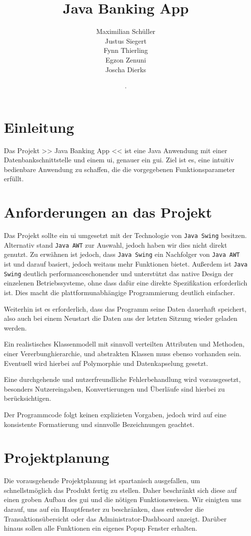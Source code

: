\documentclass[
	12pt,
	a4paper,
	hidelinks
	]{report}
\title{Java Banking App}
\author{Maximilian Schüller \\ Justus Siegert \\ Fynn Thierling \\ Egzon Zenuni \\ Joscha Dierks }
\date{\the\day. \monthword{\month} \the\year}
\newcommand{\code}[1]{\texttt{#1}}
\begin{document}
\maketitle
\tableofcontents
\newpage

\section{Einleitung}
Das Projekt >> Java Banking App << ist eine Java Anwendung mit einer Datenbankschnittstelle und einem \ac{ui}, genauer ein \ac{gui}. Ziel ist es, eine intuitiv bedienbare Anwendung zu schaffen, die die vorgegebenen Funktionsparameter erfüllt.

\section{Anforderungen an das Projekt}
Das Projekt sollte ein \ac{ui} umgesetzt mit der Technologie von \code{Java Swing} besitzen. Alternativ stand \code{Java AWT} zur Auswahl, jedoch haben wir dies nicht direkt genutzt. Zu erwähnen ist jedoch, dass \code{Java Swing} ein Nachfolger von \code{Java AWT} ist und darauf basiert, jedoch weitaus mehr Funktionen bietet. Außerdem ist \code{Java Swing} deutlich performanceschonender und unterstützt das native Design der einzelenen Betriebssysteme, ohne dass dafür eine direkte Spezifikation erforderlich ist. Dies macht die plattformunabhängige Programmierung deutlich einfacher.

Weiterhin ist es erforderlich, dass das Programm seine Daten dauerhaft speichert, also auch bei einem Neustart die Daten aus der letzten Sitzung wieder geladen werden.

Ein realistisches Klassenmodell mit sinnvoll verteilten Attributen und Methoden, einer Vererbunghierarchie, und abstrakten Klassen muss ebenso vorhanden sein. Eventuell wird hierbei auf Polymorphie und Datenkapselung gesetzt.

Eine durchgehende und nutzerfreundliche Fehlerbehandlung wird vorausgesetzt, besonders Nutzereingaben, Konvertierungen und Überläufe sind hierbei zu berücksichtigen.

Der Programmcode folgt keinen explizieten Vorgaben, jedoch wird auf eine konsistente Formatierung und sinnvolle Bezeichnungen geachtet.

\section{Projektplanung}
Die vorausgehende Projektplanung ist spartanisch ausgefallen, um schnellstmöglich das Produkt fertig zu stellen. Daher beschränkt sich diese auf einen groben Aufbau des \ac{gui} und die nötigen Funktionsweisen. Wir einigten uns darauf, uns auf ein Hauptfenster zu beschränken, dass entweder die Transaktionsübersicht oder das Administrator-Dashboard anzeigt. Darüber hinaus sollen alle Funktionen ein eigenes Popup Fenster erhalten.
\end{document}
